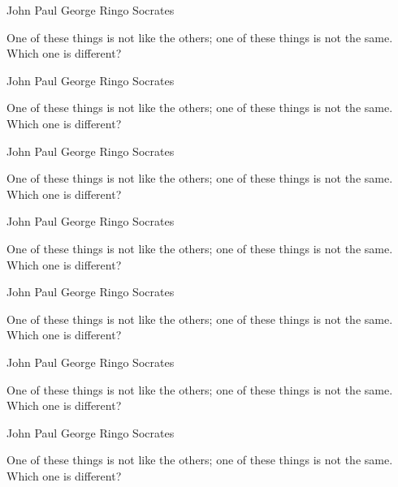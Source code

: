 \documentclass[answers,addpoints]{exam}
\begin{document}
\begin{questions}
\begin{randomizeoneparchoices}
\choice John
\choice Paul
\choice George
\choice Ringo
\CorrectChoice Socrates
\end{randomizeoneparchoices}
\question[5]
One of these things is not like the others; one of these
things is not the same. Which one is different?

\begin{randomizeoneparchoices}
\choice John
\choice Paul
\choice George
\choice Ringo
\CorrectChoice Socrates
\end{randomizeoneparchoices}
\question[5]
One of these things is not like the others; one of these
things is not the same. Which one is different?

\begin{randomizeoneparchoices}
\choice John
\choice Paul
\choice George
\choice Ringo
\CorrectChoice Socrates
\end{randomizeoneparchoices}
\question[5]
One of these things is not like the others; one of these
things is not the same. Which one is different?

\begin{randomizeoneparchoices}
\choice John
\choice Paul
\choice George
\choice Ringo
\CorrectChoice Socrates
\end{randomizeoneparchoices}
\question[5]
One of these things is not like the others; one of these
things is not the same. Which one is different?

\begin{randomizeoneparchoices}
\choice John
\choice Paul
\choice George
\choice Ringo
\CorrectChoice Socrates
\end{randomizeoneparchoices}
\question[5]
One of these things is not like the others; one of these
things is not the same. Which one is different?

\begin{randomizeoneparchoices}
\choice John
\choice Paul
\choice George
\choice Ringo
\CorrectChoice Socrates
\end{randomizeoneparchoices}
\question[5]
One of these things is not like the others; one of these
things is not the same. Which one is different?

\begin{randomizeoneparchoices}
\choice John
\choice Paul
\choice George
\choice Ringo
\CorrectChoice Socrates
\end{randomizeoneparchoices}
\question[5]
One of these things is not like the others; one of these
things is not the same. Which one is different?


\end{questions}
\end{document}
